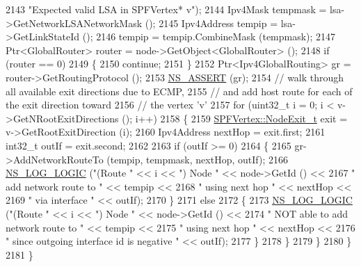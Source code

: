 \begin{DoxyCode}
2143                          \textcolor{stringliteral}{"Expected valid LSA in SPFVertex* v"});
2144           Ipv4Mask tempmask = lsa->GetNetworkLSANetworkMask ();
2145           Ipv4Address tempip = lsa->GetLinkStateId ();
2146           tempip = tempip.CombineMask (tempmask);
2147           Ptr<GlobalRouter> router = node->GetObject<GlobalRouter> ();
2148           \textcolor{keywordflow}{if} (router == 0)
2149             \{
2150               \textcolor{keywordflow}{continue};
2151             \}
2152           Ptr<Ipv4GlobalRouting> gr = router->GetRoutingProtocol ();
2153           \hyperlink{assert_8h_a6dccdb0de9b252f60088ce281c49d052}{NS\_ASSERT} (gr);
2154           \textcolor{comment}{// walk through all available exit directions due to ECMP,}
2155           \textcolor{comment}{// and add host route for each of the exit direction toward}
2156           \textcolor{comment}{// the vertex 'v'}
2157           \textcolor{keywordflow}{for} (uint32\_t i = 0; i < v->GetNRootExitDirections (); i++)
2158             \{
2159               \hyperlink{classns3_1_1SPFVertex_a0adf6255ec0357050ef5436597b4cb32}{SPFVertex::NodeExit\_t} exit = v->GetRootExitDirection (i);
2160               Ipv4Address nextHop = exit.first;
2161               int32\_t outIf = exit.second;
2162 
2163               \textcolor{keywordflow}{if} (outIf >= 0)
2164                 \{
2165                   gr->AddNetworkRouteTo (tempip, tempmask, nextHop, outIf);
2166                   \hyperlink{group__logging_ga88acd260151caf2db9c0fc84997f45ce}{NS\_LOG\_LOGIC} (\textcolor{stringliteral}{"(Route "} << i << \textcolor{stringliteral}{") Node "} << node->GetId () <<
2167                                 \textcolor{stringliteral}{" add network route to "} << tempip <<
2168                                 \textcolor{stringliteral}{" using next hop "} << nextHop <<
2169                                 \textcolor{stringliteral}{" via interface "} << outIf);
2170                 \}
2171               \textcolor{keywordflow}{else}
2172                 \{
2173                   \hyperlink{group__logging_ga88acd260151caf2db9c0fc84997f45ce}{NS\_LOG\_LOGIC} (\textcolor{stringliteral}{"(Route "} << i << \textcolor{stringliteral}{") Node "} << node->GetId () <<
2174                                 \textcolor{stringliteral}{" NOT able to add network route to "} << tempip <<
2175                                 \textcolor{stringliteral}{" using next hop "} << nextHop <<
2176                                 \textcolor{stringliteral}{" since outgoing interface id is negative "} << outIf);
2177                 \}
2178             \}
2179         \}
2180     \} 
2181 \}
\end{DoxyCode}


